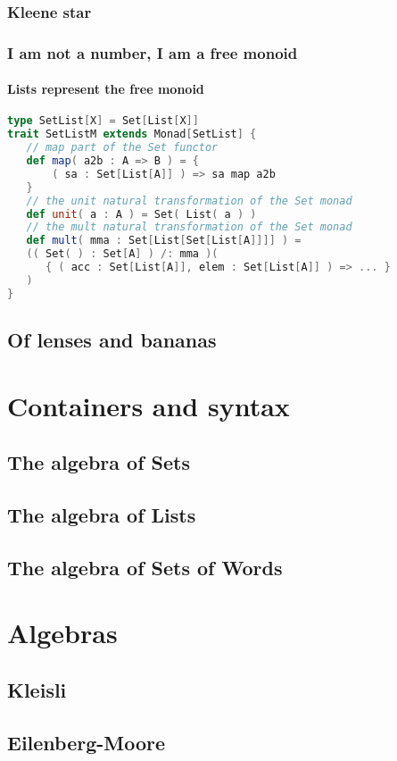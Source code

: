 \subsubsection{Kleene star}

\subsubsection{I am not a number, I am a free monoid}

\paragraph{Lists represent the free monoid}

\begin{lstlisting}[language=Scala,mathescape=true]
type SetList[X] = Set[List[X]]
trait SetListM extends Monad[SetList] {
   // map part of the Set functor
   def map( a2b : A => B ) = {
       ( sa : Set[List[A]] ) => sa map a2b
   }
   // the unit natural transformation of the Set monad
   def unit( a : A ) = Set( List( a ) )
   // the mult natural transformation of the Set monad
   def mult( mma : Set[List[Set[List[A]]]] ) =
   (( Set( ) : Set[A] ) /: mma )(
      { ( acc : Set[List[A]], elem : Set[List[A]] ) => ... }
   )
}
\end{lstlisting}

\subsection{Of lenses and bananas}

\section{Containers and syntax}

\subsection{The algebra of Sets}

\subsection{The algebra of Lists}

\subsection{The algebra of Sets of Words}

\section{Algebras}

\subsection{Kleisli}

\subsection{Eilenberg-Moore}